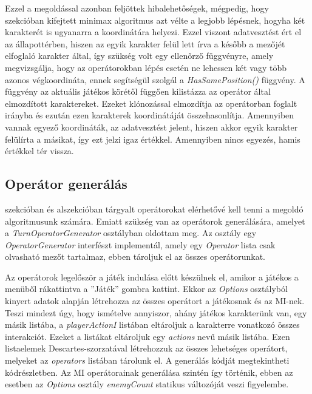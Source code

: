 \documentclass[
]{thesis-ekf}
\theoremstyle{definition}
\theoremstyle{remark}
\begin{document}
Ezzel a megoldással azonban feljöttek hibalehetőségek, mégpedig, hogy  szekcióban kifejtett minimax algoritmus azt vélte a legjobb lépésnek, hogyha két karakterét is ugyanarra a koordinátára helyezi. Ezzel viszont adatvesztést ért el az állapottérben, hiszen az egyik karakter felül lett írva a később a mezőjét elfoglaló karakter által, így szükség volt egy ellenőrző függvényre, amely megvizsgálja, hogy az operátorokban lépés esetén ne lehessen két vagy több azonos végkoordináta, ennek segítségül szolgál a \emph{HasSamePosition()} függvény. A függvény az aktuális játékos körétől függően kilistázza az operátor által elmozdított karaktereket. Ezeket klónozással elmozdítja az operátorban foglalt irányba és ezután ezen karakterek koordinátáját összehasonlítja. Amennyiben vannak egyező koordináták, az adatvesztést jelent, hiszen akkor egyik karakter felülírta a másikat, így ezt jelzi igaz értékkel. Amennyiben nincs egyezés, hamis értékkel tér vissza.

\subsection{Operátor generálás} \label{operatorgen}

 szekcióban és  alszekcióban tárgyalt operátorokat elérhetővé kell tenni a megoldó algoritmusunk számára. Emiatt szükség van az operátorok generálására, amelyet a \emph{TurnOperatorGenerator} osztályban oldottam meg. Az osztály egy \emph{OperatorGenerator} interfészt implementál, amely egy \emph{Operator} lista csak olvasható mezőt tartalmaz, ebben tároljuk el az összes operátorunkat.

Az operátorok legelőször a játék indulása előtt készülnek el, amikor a játékos a menüből rákattintva a ''Játék'' gombra kattint. Ekkor az \emph{Options} osztályból kinyert adatok alapján létrehozza az összes operátort a játékosnak és az MI-nek. Teszi mindezt úgy, hogy ismételve annyiszor, ahány játékos karakterünk van, egy másik listába, a \emph{playerActionI} listában eltároljuk a karakterre vonatkozó összes interakciót. Ezeket a listákat eltároljuk egy \emph{actions} nevű másik listába. Ezen listaelemek Descartes-szorzatával létrehozzuk az összes lehetséges operátort, melyeket az \emph{operators} listában tárolunk el. A generálás kódját megtekintheti  kódrészletben. Az MI operátorainak generálása szintén így történik, ebben az esetben az \emph{Options} osztály \emph{enemyCount} statikus változóját veszi figyelembe.
\end{document}
